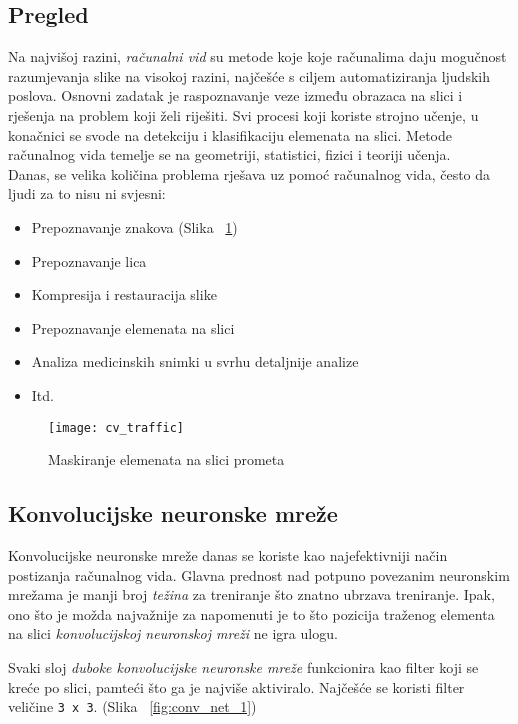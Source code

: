 \subsection{Pregled}
Na najvišoj razini, \emph{računalni vid} su metode koje koje računalima daju mogučnost razumjevanja slike na visokoj razini, najčešće s ciljem automatiziranja ljudskih poslova.
Osnovni zadatak je raspoznavanje veze između obrazaca na slici i rješenja na problem koji želi riješiti. Svi procesi koji koriste strojno učenje, u konačnici se svode na  detekciju i klasifikaciju elemenata na slici. Metode računalnog vida temelje se na geometriji, statistici, fizici i teoriji učenja. \\
Danas, se velika količina problema rješava uz pomoć računalnog vida, često da ljudi za to nisu ni svjesni:
\begin{itemize}
\item Prepoznavanje znakova (Slika ~\ref{fig:cv_traffic_1})	
\item Prepoznavanje lica
\item Kompresija i restauracija slike
\item Prepoznavanje elemenata na slici
\item Analiza medicinskih snimki u svrhu detaljnije analize
\item Itd.
\end{itemize} 

\begin{figure}[h!]
	\centering
	\texttt{[image: cv\_traffic]}
	 \caption{Maskiranje elemenata na slici prometa}
 	 \label{fig:cv_traffic_1}
\end{figure}

\subsection{Konvolucijske neuronske mreže}
Konvolucijske neuronske mreže danas se koriste kao najefektivniji način postizanja računalnog vida. Glavna prednost nad potpuno povezanim neuronskim mrežama je manji broj \emph{težina} za treniranje što znatno ubrzava treniranje. Ipak, ono što je možda najvažnije za napomenuti je to što pozicija traženog elementa na slici \emph{konvolucijskoj neuronskoj mreži} ne igra ulogu. 

Svaki sloj \emph{duboke konvolucijske neuronske mreže} funkcionira kao filter koji se kreće po slici, pamteći što ga je najviše aktiviralo. Najčešće se koristi filter veličine \texttt{3 x 3}.
(Slika ~\ref{fig:conv_net_1})

